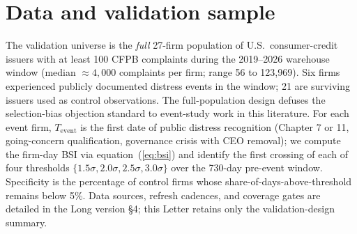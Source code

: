\documentclass[11pt,a4paper]{article}
\begin{document}
\begin{table}[h]
\centering\small
{}
\caption{Pre-registered BSI pillar composition. Weights $w_k$ and half-lives $\lambda_k$ were hash-locked at the start of the validation sample (2019-01-01) and are not adjusted during validation. Coverage gates suppress firm-days where pillar coverage falls below 60\%; gating decisions are recorded in the audit log.}\label{tab:weights}
\end{table}

\section{Data and validation sample}\label{sec:data}

The validation universe is the \emph{full} 27-firm population of U.S.\ consumer-credit issuers with at least 100 CFPB complaints during the 2019--2026 warehouse window (median $\approx 4{,}000$ complaints per firm; range 56 to 123{,}969). Six firms experienced publicly documented distress events in the window; 21 are surviving issuers used as control observations. The full-population design defuses the selection-bias objection standard to event-study work in this literature. For each event firm, $T_{\text{event}}$ is the first date of public distress recognition (Chapter 7 or 11, going-concern qualification, governance crisis with CEO removal); we compute the firm-day BSI via equation~(\ref{eq:bsi}) and identify the first crossing of each of four thresholds $\{1.5\sigma, 2.0\sigma, 2.5\sigma, 3.0\sigma\}$ over the 730-day pre-event window. Specificity is the percentage of control firms whose share-of-days-above-threshold remains below 5\%. Data sources, refresh cadences, and coverage gates are detailed in the Long version §4; this Letter retains only the validation-design summary.
\end{document}
